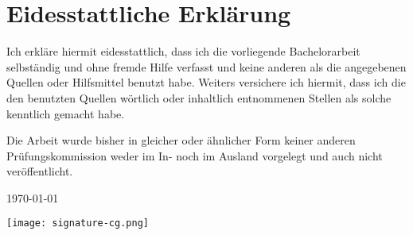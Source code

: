 \section*{Eidesstattliche Erklärung}

Ich erkläre hiermit eidesstattlich, dass ich die vorliegende Bachelorarbeit
selbständig und ohne fremde Hilfe verfasst und keine anderen als die
angegebenen Quellen oder Hilfsmittel benutzt habe. Weiters versichere ich
hiermit, dass ich die den benutzten Quellen wörtlich oder inhaltlich
entnommenen Stellen als solche kenntlich gemacht habe.

Die Arbeit wurde bisher in gleicher oder ähnlicher Form keiner anderen
Prüfungskommission weder im In- noch im Ausland vorgelegt und auch nicht
veröffentlicht.

\vspace*{1cm}
\today
\vspace*{1cm}

\texttt{[image: signature-cg.png]} \\
\myName


